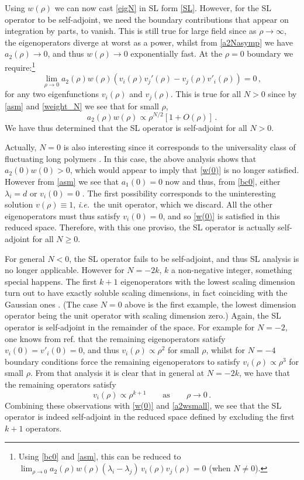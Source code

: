 \documentclass[11pt,a4paper]{article}
\numberwithin{figure}{section}
\numberwithin{equation}{section}
\newcommand{\be}{\begin{equation}}
\newcommand{\ee}{\end{equation}}
\newcommand\ie{\textit{i.e.}\ }
\begin{document}
Using $w(\rho)$ we can now cast \eqref{eigN} in SL form \eqref{SL}. However, for the SL operator to be self-adjoint, we need the boundary contributions that appear on integration by parts, to vanish. This is still true for large field since as $\rho\to\infty$, the eigenoperators diverge at worst as a power, whilst  from \eqref{a2Nasymp} we have $a_2(\rho)\to0$, and thus $w(\rho)\to0$ exponentially fast. At the $\rho=0$ boundary we require:\footnote{Using  \eqref{bc0} and \eqref{asm}, this can be reduced to $\lim_{\rho\to0}a_2(\rho)w(\rho)(\lambda_i-\lambda_j)\,v_i(\rho)v_j(\rho) = 0$ (when $N\ne0$).}
\begin{equation}
\lim_{\rho\to0}  a_2(\rho)w(\rho)\left(v_i(\rho)v_j'(\rho)-v_j(\rho)v'_i(\rho)\right)=0 \,, \label{w(0)}
\end{equation}
for any two eigenfunctions $v_i(\rho)$ and $v_j(\rho)$. This is true for all $N>0$ since by \eqref{asm} and \eqref{weight_N} we see that for small $\rho$,
\be  
\label{a2wsmall}
a_2(\rho)w(\rho) \propto \rho^{N/2} \left[1+O(\rho)\right]\,.
\ee
We have thus determined that the SL operator is self-adjoint for all $N>0$. 

Actually, $N=0$ is also interesting since it corresponds to the universality class of fluctuating long polymers \cite{ZinnJustin:2002ru}. In this case, the above analysis shows that $a_2(0)w(0)>0$, which would appear to imply that \eqref{w(0)} is no longer satisfied. However from \eqref{asm} we see that $a_1(0)=0$ now and thus, from \eqref{bc0}, either $\lambda_i=d$ or $v_i(0)=0$ \cite{Morris:1997xj}. The first possibility corresponds to the uninteresting solution $v(\rho)\equiv1$, \ie the unit operator, which we discard. All the other eigenoperators must thus satisfy $v_i(0)=0$, and so \eqref{w(0)} is satisfied in this reduced space. Therefore, with this one proviso, the SL operator is actually self-adjoint for all $N\ge0$. 

For general $N<0$, the SL operator fails to be self-adjoint, and thus SL analysis is no longer applicable. However for $N=-2k$, $k$ a non-negative integer,  something special happens. The first $k+1$ eigenoperators with the lowest scaling dimension turn out to have exactly soluble scaling dimensions, in fact coinciding with the Gaussian ones \cite{PhysRevLett.30.544,PhysRevLett.30.679,RevModPhys.46.597}. (The case $N=0$ above is the first example, the lowest dimension operator being the unit operator with scaling dimension zero.) Again, the SL operator is self-adjoint in the remainder of the space. For example for $N=-2$, one knows from ref. \cite{Morris:1997xj} that the remaining eigenoperators satisfy $v_i(0)=v'_i(0)=0$, and thus $v_i(\rho)\propto\rho^2$ for small $\rho$, whilst for $N=-4$ boundary conditions force the remaining eigenoperators to satisfy $v_i(\rho)\propto \rho^3$ for small $\rho$. From that analysis it is clear that in general at $N=-2k$, we have that the remaining operators satisfy 
\be \label{vmcase} v_i(\rho)\propto\rho^{k+1}\qquad\text{as}\qquad\rho\to0\,.\ee 
Combining these observations with \eqref{w(0)} and \eqref{a2wsmall}, we see that the SL operator is indeed self-adjoint in the reduced space defined by excluding the first $k+1$ operators.
\end{document}
